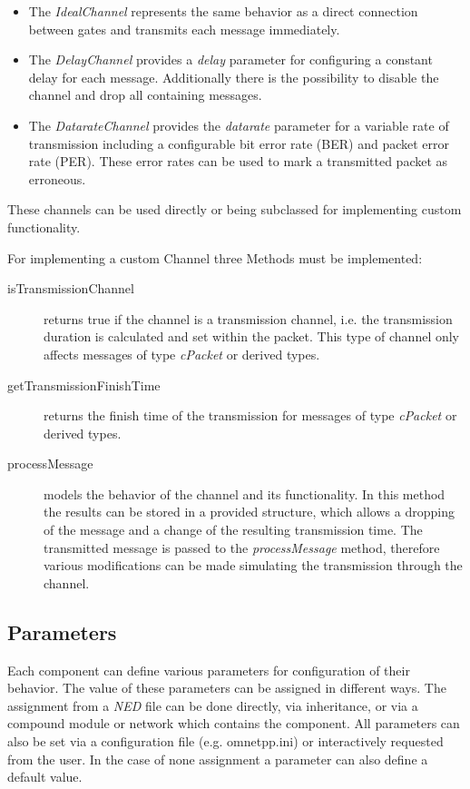 \begin{itemize}
    \item The \emph{IdealChannel} represents the same behavior as a direct connection between gates and transmits each message immediately.
    \item The \emph{DelayChannel} provides a \emph{delay} parameter for configuring a constant delay for each message.
    Additionally there is the possibility to disable the channel and drop all containing messages.
    \item The \emph{DatarateChannel} provides the \emph{datarate} parameter for a variable rate of transmission including a configurable bit error rate (BER) and packet error rate (PER).
    These error rates can be used to mark a transmitted packet as erroneous.
\end{itemize}

These channels can be used directly or being subclassed for implementing custom functionality. \cite[section 3.5]{omnet_manual}

For implementing a custom Channel three Methods must be implemented:

\begin{description}
    \item[isTransmissionChannel] returns true if the channel is a transmission channel, i.e. the transmission duration is calculated and set within the packet.
    This type of channel only affects messages of type \emph{cPacket} or derived types.
    \item[getTransmissionFinishTime] returns the finish time of the transmission for messages of type \emph{cPacket} or derived types.
    \item[processMessage] models the behavior of the channel and its functionality.
    In this method the results can be stored in a provided structure, which allows a dropping of the message and a change of the resulting transmission time.
    The transmitted message is passed to the \emph{processMessage} method, therefore various modifications can be made simulating the transmission through the channel. \cite[section 4.8]{omnet_manual}
\end{description}

\subsection{Parameters}
\label{sec:omnet_components_parameters}
Each component can define various parameters for configuration of their behavior.
The value of these parameters can be assigned in different ways.
The assignment from a \emph{NED} file can be done directly, via inheritance, or via a compound module or network which contains the component.
All parameters can also be set via a configuration file (e.g. omnetpp.ini) or interactively requested from the user.
In the case of none assignment a parameter can also define a default value.


